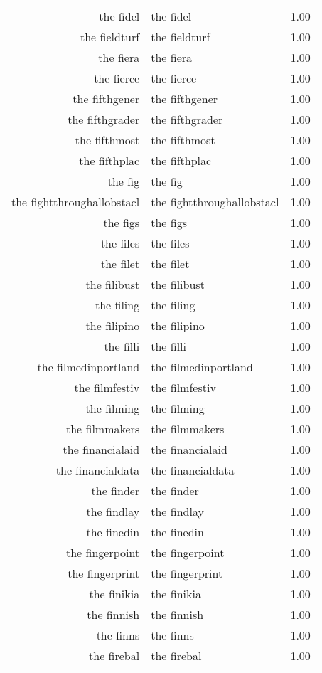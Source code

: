 \begin{table}[ht]
\begin{tabular}{rlr}
  the fidel & the fidel & 1.00 \\ 
  the fieldturf & the fieldturf & 1.00 \\ 
  the fiera & the fiera & 1.00 \\ 
  the fierce & the fierce & 1.00 \\ 
  the fifthgener & the fifthgener & 1.00 \\ 
  the fifthgrader & the fifthgrader & 1.00 \\ 
  the fifthmost & the fifthmost & 1.00 \\ 
  the fifthplac & the fifthplac & 1.00 \\ 
  the fig & the fig & 1.00 \\ 
  the fightthroughallobstacl & the fightthroughallobstacl & 1.00 \\ 
  the figs & the figs & 1.00 \\ 
  the files & the files & 1.00 \\ 
  the filet & the filet & 1.00 \\ 
  the filibust & the filibust & 1.00 \\ 
  the filing & the filing & 1.00 \\ 
  the filipino & the filipino & 1.00 \\ 
  the filli & the filli & 1.00 \\ 
  the filmedinportland & the filmedinportland & 1.00 \\ 
  the filmfestiv & the filmfestiv & 1.00 \\ 
  the filming & the filming & 1.00 \\ 
  the filmmakers & the filmmakers & 1.00 \\ 
  the financialaid & the financialaid & 1.00 \\ 
  the financialdata & the financialdata & 1.00 \\ 
  the finder & the finder & 1.00 \\ 
  the findlay & the findlay & 1.00 \\ 
  the finedin & the finedin & 1.00 \\ 
  the fingerpoint & the fingerpoint & 1.00 \\ 
  the fingerprint & the fingerprint & 1.00 \\ 
  the finikia & the finikia & 1.00 \\ 
  the finnish & the finnish & 1.00 \\ 
  the finns & the finns & 1.00 \\ 
  the firebal & the firebal & 1.00 \\ 

\end{tabular}
\end{table}
